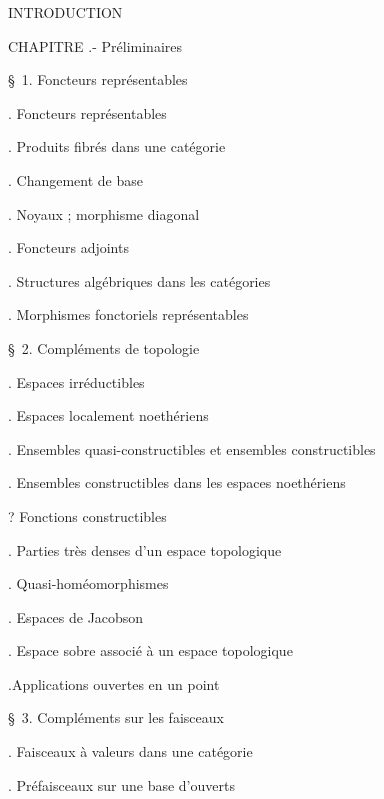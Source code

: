 \noindent INTRODUCTION\dotfill

\noindent CHAPITRE  .- Préliminaires\dotfill

\noindent\quad \S\ 1. Foncteurs représentables\dotfill

\noindent{}. Foncteurs représentables\dotfill

\noindent{}. Produits fibrés dans une catégorie\dotfill

\noindent{}. Changement de base\dotfill

\noindent{}. Noyaux ; morphisme diagonal\dotfill

\noindent{}. Foncteurs adjoints\dotfill

\noindent{}. Structures algébriques dans les catégories\dotfill

\noindent{}. Morphismes fonctoriels représentables\dotfill

\noindent\quad \S\ 2. Compléments de topologie\dotfill

\noindent{}. Espaces irréductibles\dotfill

\noindent{}. Espaces localement noethériens\dotfill

\noindent{}. Ensembles quasi-constructibles et ensembles constructibles\dotfill

\noindent\qquad {}

\noindent\qquad {}

\noindent{}. Ensembles constructibles dans les espaces noethériens

\noindent{}? Fonctions constructibles\dotfill

\noindent{}. Parties très denses d'un espace topologique\dotfill

\noindent{}. Quasi-homéomorphismes\dotfill

\noindent{}. Espaces de Jacobson\dotfill

\noindent{}. Espace sobre associé à un espace topologique\dotfill

\noindent{}.Applications ouvertes en un point \dotfill

\noindent\quad \S\ 3. Compléments sur les faisceaux\dotfill

\noindent{}. Faisceaux à valeurs dans une catégorie\dotfill

\noindent{}. Préfaisceaux sur une base d'ouverts\dotfill

